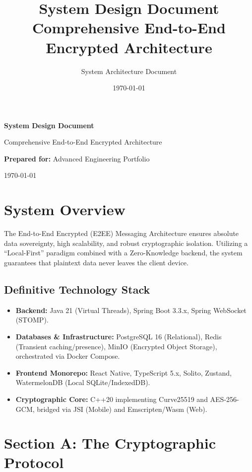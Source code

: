 \documentclass[12pt, a4paper]{article}
\title{\textbf{System Design Document}\\ \large Comprehensive End-to-End Encrypted Architecture}
\author{System Architecture Document}
\date{\today}
\begin{document}
\begin{titlepage}
    \centering
    \vspace*{\fill}
    {\Huge \textbf{System Design Document} \par}
    \vspace{0.5cm}
    {\large Comprehensive End-to-End Encrypted Architecture \par}
    \vspace{1cm}
    {\Large \textbf{Prepared for:} Advanced Engineering Portfolio \par}
    \vspace{0.5cm}
    {\large \today \par}
    \vspace*{\fill}
\end{titlepage}
\tableofcontents
\newpage

\section{System Overview}
\label{sec:overview}
The End-to-End Encrypted (E2EE) Messaging Architecture ensures absolute data sovereignty, high scalability, and robust cryptographic isolation. Utilizing a ``Local-First'' paradigm combined with a Zero-Knowledge backend, the system guarantees that plaintext data never leaves the client device.

\subsection{Definitive Technology Stack}
\begin{itemize}
    \item \textbf{Backend:} Java 21 (Virtual Threads), Spring Boot 3.3.x, Spring WebSocket (STOMP).
    \item \textbf{Databases \& Infrastructure:} PostgreSQL 16 (Relational), Redis (Transient caching/presence), MinIO (Encrypted Object Storage), orchestrated via Docker Compose.
    \item \textbf{Frontend Monorepo:} React Native, TypeScript 5.x, Solito, Zustand, WatermelonDB (Local SQLite/IndexedDB).
    \item \textbf{Cryptographic Core:} C++20 implementing Curve25519 and AES-256-GCM, bridged via JSI (Mobile) and Emscripten/Wasm (Web).
\end{itemize}

\section{Section A: The Cryptographic Protocol}
\label{sec:crypto}
\end{document}
